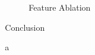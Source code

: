 \documentclass[final]{beamer}
\newlength{\sepwid}
\newlength{\onecolwid}
\newlength{\twocolwid}
\begin{document}
\begin{frame}[t]
\begin{columns}[t]
\begin{column}{\twocolwid}
\begin{columns}[t,totalwidth=\twocolwid]
\begin{column}{\onecolwid}

\end{column} %

\begin{column}{\onecolwid} %



\end{column} %

\end{columns} %

\end{column} %

\begin{column}{\sepwid}\end{column} %

\begin{column}{\onecolwid} %

\begin{figure}
\caption{Feature Ablation}
\end{figure}


\begin{block}{Conclusion}

a

\end{block}




\end{column}
\end{columns}
\end{frame}
\end{document}
